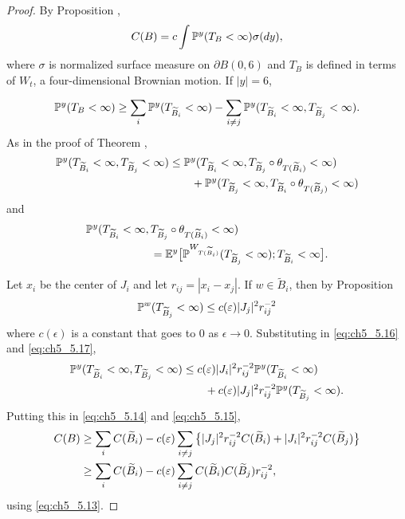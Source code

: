 \begin{proof}
By Proposition ,
\begin{equation}\label{eq:ch5_5.14}
    C(B) = c \int \P^y(T_B < \infty)\sigma(dy),
\end{equation}
where $\sigma$ is normalized surface measure on $\partial B(0,6)$ and $T_B$ is defined in terms of $W_t$, a four-dimensional Brownian motion. If $|y| = 6$,


\begin{equation}\label{eq:ch5_5.15}
\P^y(T_B < \infty) \geq \sum_i \P^y(T_{\widetilde{B}_i} < \infty) - \sum_{i\neq j} \P^y(T_{\widetilde{B}_i} < \infty, T_{\widetilde{B}_j} < \infty).
\end{equation}
As in the proof of Theorem ,
\begin{align}\label{eq:ch5_5.16}
    \P^y(T_{\widetilde{B}_i} < \infty, T_{\widetilde{B}_j} < \infty) &\leq \P^y(T_{\widetilde{B}_i} < \infty, T_{\widetilde{B}_j} \circ \theta_{T(\widetilde{B}_i)} < \infty) \\
    &\qquad+ \P^y(T_{\widetilde{B}_j} < \infty, T_{\widetilde{B}_i} \circ \theta_{T(\widetilde{B}_j)} < \infty) \notag
\end{align}
and
\begin{align}\label{eq:ch5_5.17}
    \P^y(T_{\widetilde{B}_i} < \infty,\,&T_{\widetilde{B}_j} \circ \theta_{T(\widetilde{B}_i)} < \infty) \\
    &= \E^y\big[\P^{W_{T(\widetilde{B}_i)}}(T_{\widetilde{B}_j} < \infty); T_{\widetilde{B}_i} < \infty\big]. \notag
\end{align}

\mnewpage

Let $x_i$ be the center of $J_i$ and let $r_{ij} = |x_i - x_j|$. If $w \in \widetilde{B}_i$, then by Proposition 
\begin{equation}\label{eq:ch5_5.18}
    \P^w(T_{\widetilde{B}_j} < \infty) \leq c(\epsilon)|J_j|^2r_{ij}^{-2}
\end{equation}
where $c(\epsilon)$ is a constant that goes to $0$ as $\epsilon \to 0$. Substituting in \eqref{eq:ch5_5.16} and \eqref{eq:ch5_5.17},
\begin{align*}
    \P^y(T_{\widetilde{B}_i} < \infty, T_{\widetilde{B}_j} < \infty) &\leq c(\epsilon)|J_i|^2r_{ij}^{-2}\P^y(T_{\widetilde{B}_i} < \infty) \\
    &\qquad+ c(\epsilon)|J_j|^2r_{ij}^{-2}\P^y(T_{\widetilde{B}_j} < \infty).
\end{align*}
Putting this in \eqref{eq:ch5_5.14} and \eqref{eq:ch5_5.15},
\begin{align}\label{eq:ch5_5.19}
    C(B) &\geq \sum_i C(\widetilde{B}_i) - c(\epsilon)\sum_{i\neq j}\big\{|J_j|^2 r_{ij}^{-2}C(\widetilde{B}_i)+|J_i|^2 r_{ij}^{-2}C(\widetilde{B}_j)\big\} \\
    &\geq\sum_i C(\widetilde{B}_i) - c(\epsilon)\sum_{i\neq j}C(\widetilde{B}_i)C(\widetilde{B}_j)r_{ij}^{-2}, \notag
\end{align}
using \eqref{eq:ch5_5.13}.


\end{proof}
